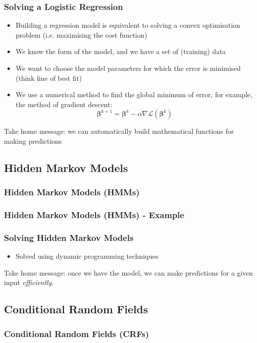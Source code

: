 \documentclass{beamer}
\begin{document}

\begin{frame}
\frametitle{Solving a Logistic Regression}\begin{itemize}
\item Building a regression model is equivalent to solving a convex optimisation problem (i.e. maximising the cost function)
\item We know the form of the model, and we have a set of (training) data
\item We want to choose the model parameters for which the error is minimised (think line of best fit)
\item We use a numerical method to find the global minimum of error, for example, the method of gradient descent:
$$\boldsymbol\beta^{k+1} = \boldsymbol\beta^{k} - \alpha\nabla\mathcal{L}(\boldsymbol\beta^{k})$$
\end{itemize}
Take home message: we can automatically build mathematical functions for making predictions
\end{frame}


\subsection{Hidden Markov Models}
\begin{frame}
\frametitle{Hidden Markov Models (HMMs)}
\end{frame}


\begin{frame}
\frametitle{Hidden Markov Models (HMMs) - Example}
\end{frame}


\begin{frame}
\frametitle{Solving Hidden Markov Models}
\begin{itemize}
\item Solved using dynamic programming techniques
\end{itemize}
Take home message: once we have the model, we can make predictions for a given input \emph{efficiently}.
\end{frame}


\subsection{Conditional Random Fields}
\begin{frame}
\frametitle{Conditional Random Fields (CRFs)}
\end{frame}
\end{document}
